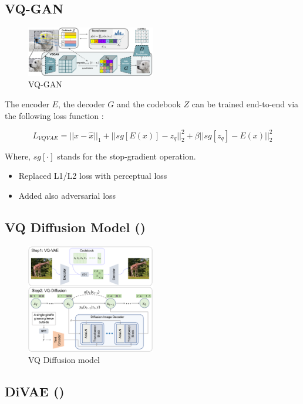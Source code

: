 \subsection{VQ-GAN}
\begin{figure}[h!]
    \centering
    \includegraphics[width=0.5\textwidth]{images/vqgan.png}
    \caption{VQ-GAN}
    \label{fig:vq_gan}
\end{figure}
The encoder $E$, the decoder $G$ and the codebook $Z$ can be trained end-to-end via the following loss function \cite{esse2021vqgan}:


$$L_{VQVAE} = || x - \hat{x}||_1 + || sg[E(x)] -  z_q ||_2^2  + \beta || sg[z_q] - E(x)||_2^2$$

Where, $sg[\cdot ]$ stands for the stop-gradient operation.

\begin{itemize}
    \item Replaced L1/L2 loss with perceptual loss
    \item Added also adversarial loss
\end{itemize}


\subsection{VQ Diffusion Model (\cite{gu2021vector})}
\begin{figure}[h!]
    \centering
    \includegraphics[width=0.5\textwidth]{images/vqddpm.png}
    \caption{VQ Diffusion model}
    \label{fig:vqddpm}
\end{figure}

\subsection{DiVAE (\cite{shi2022divae})}

